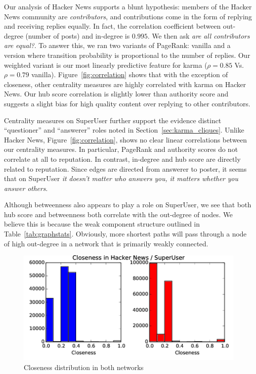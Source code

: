 \documentclass[11pt]{article}
\begin{document}
Our analysis of Hacker News supports a blunt hypothesis: members of the Hacker
News community are \textit{contributors}, and contributions come in the form of
replying and receiving replies equally. In fact, the correlation coefficient
between out-degree (number of posts) and in-degree is $0.995$. We then ask
\textit{are all contributors are equal?}. To answer this, we ran two variants of
PageRank: vanilla and a version where transition probability is proportional to
the number of replies. Our weighted variant is our most linearly predictive
feature for karma ($\rho = 0.85$ Vs. $\rho=0.79$ vanilla).
Figure~\ref{fig:correlation} shows that with the exception of closeness, other
centrality measures are highly correlated with karma on Hacker News.  
Our hub score correlation is slightly lower than authority score and suggests 
a slight bias for high quality content over replying to other contributors.

Centrality measures on SuperUser further support the evidence distinct
``questioner'' and ``answerer'' roles noted in Section~\ref{sec:karma_cliques}.
Unlike Hacker News, Figure~\ref{fig:correlation}, shows no clear linear
correlations between our centrality measures. In particular, PageRank and
authority scores do not correlate at all to reputation. In contrast,  in-degree 
and hub score are directly related to reputation. Since edges are directed from answerer
to poster, it seems that on SuperUser
\textit{it doesn't matter who answers you, it matters whether you answer others}.

Although betweenness also appears to play a role on SuperUser, we see that
both hub score and betweenness both correlate with the out-degree of nodes.
We believe this is because the weak component structure outlined in 
Table~\ref{tab:graphstats}. Obviously, more shortest paths will pass through a
node of high out-degree in a network that is primarily weakly connected.

\begin{figure}[h]
\centering
\includegraphics[width=\linewidth]{closeness-png}
\caption{Closeness distribution in both networks}
\label{fig:closeness}

\end{figure}
\end{document}
